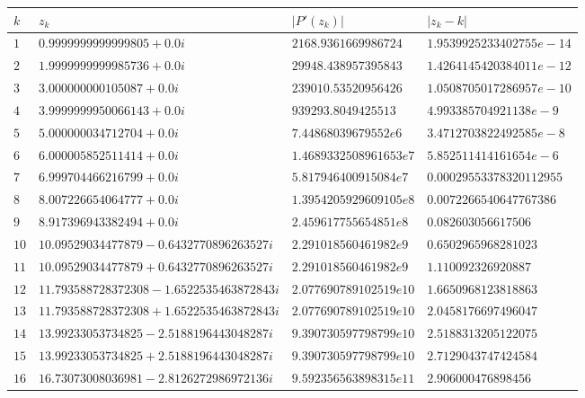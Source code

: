\documentclass[12pt]{article}
\begin{document}
        \begin{table}[h!]
            \begin{adjustwidth}{-0.8cm}{}
            \begin{tabularx}{1.065\textwidth}{l l l l }
                \hline
                $k$ & $z_k$ & $|P'(z_k)|$ & $|z_k - k|$ \\
                \hline
                $1$ & $0.9999999999999805 + 0.0i$ & $2168.9361669986724$ & $1.9539925233402755e-14$ \\
                $2$ & $1.9999999999985736 + 0.0i$ & $29948.438957395843$ & $1.4264145420384011e-12$ \\
                $3$ & $3.000000000105087 + 0.0i$ & $239010.53520956426$ & $1.0508705017286957e-10$ \\
                $4$ & $3.9999999950066143 + 0.0i$ & $939293.8049425513$ & $4.993385704921138e-9$ \\
                $5$ & $5.000000034712704 + 0.0i$ & $7.44868039679552e6$ & $3.4712703822492585e-8$ \\
                $6$ & $6.000005852511414 + 0.0i$ & $1.4689332508961653e7$ & $5.852511414161654e-6$ \\
                $7$ & $6.999704466216799 + 0.0i$ & $5.817946400915084e7$ & $0.00029553378320112955$ \\
                $8$ & $8.007226654064777 + 0.0i$ & $1.3954205929609105e8$ & $0.0072266540647767386$ \\
                $9$ & $8.917396943382494 + 0.0i$ & $2.459617755654851e8$ & $0.082603056617506$ \\
                $10$ & $10.09529034477879 - 0.6432770896263527i$ & $2.291018560461982e9$ & $0.6502965968281023$ \\
                $11$ & $10.09529034477879 + 0.6432770896263527i$ & $2.291018560461982e9$ & $1.110092326920887$ \\
                $12$ & $11.793588728372308 - 1.6522535463872843i$ & $2.077690789102519e10$ & $1.6650968123818863$ \\
                $13$ & $11.793588728372308 + 1.6522535463872843i$ & $2.077690789102519e10$ & $2.0458176697496047$ \\
                $14$ & $13.99233053734825 - 2.5188196443048287i$ & $9.390730597798799e10$ & $2.5188313205122075$ \\
                $15$ & $13.99233053734825 + 2.5188196443048287i$ & $9.390730597798799e10$ & $2.7129043747424584$ \\
                $16$ & $16.73073008036981 - 2.8126272986972136i$ & $9.592356563898315e11$ & $2.906000476898456$ \\

\end{tabularx}
\end{adjustwidth}
\end{table}
\end{document}
